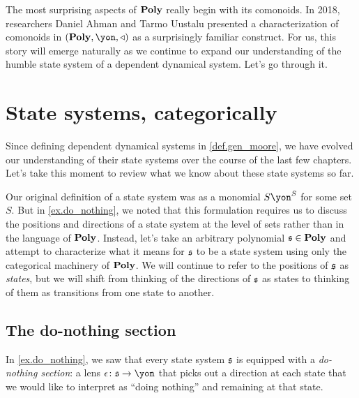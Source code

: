 \documentclass[Book-Poly]{subfiles}
\begin{document}

The most surprising aspects of $\mathbf{Poly}$ really begin with its comonoids.
In 2018, researchers Daniel Ahman and Tarmo Uustalu presented a characterization of comonoids in $(\poly,\yon,\tri)$ as a surprisingly familiar construct.
For us, this story will emerge naturally as we continue to expand our understanding of the humble state system of a dependent dynamical system.
Let's go through it.

\section{State systems, categorically}\label{sec.comon.sharp.state}

Since defining dependent dynamical systems in \cref{def.gen_moore}, we have evolved our understanding of their state systems over the course of the last few chapters.
Let's take this moment to review what we know about these state systems so far.

Our original definition of a state system was as a monomial $S\yon^S$ for some set $S$.
But in \cref{ex.do_nothing}, we noted that this formulation requires us to discuss the positions and directions of a state system at the level of sets rather than in the language of $\mathbf{Poly}$.
Instead, let's take an arbitrary polynomial $\mathfrak{s}\in\mathbf{Poly}$ and attempt to characterize what it means for $\mathfrak{s}$ to be a state system using only the categorical machinery of $\mathbf{Poly}$.
We will continue to refer to the positions of $\mathfrak{s}$ as \emph{states}, but we will shift from thinking of the directions of $\mathfrak{s}$ as states to thinking of them as transitions from one state to another.

\subsection{The do-nothing section}\label{subsec.comon.sharp.state.nothing}

In \cref{ex.do_nothing}, we saw that every state system $\mathfrak{s}$ is equipped with a \emph{do-nothing section}: a lens $\epsilon\colon\car{s}\to\yon$ that picks out a direction at each state that we would like to interpret as ``doing nothing'' and remaining at that state.
\end{document}
